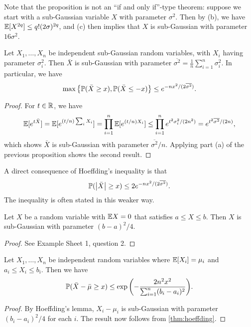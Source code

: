 Note that the proposition is not an ``if and only if''-type theorem: suppose we start with a sub-Gaussian variable $X$ with parameter $\sigma^2$. Then by (b), we have $\mathbb E[X^{2q}] \leq q!(2\sigma)^{2q}$, and (c) then implies that $X$ is sub-Gaussian with parameter $16\sigma^2$. 

\begin{theorem} \label{thm:hoeffding}
	Let $X_1, \dotsc, X_n$ be independent sub-Gaussian random variables, with $X_i$ having parameter $\sigma_i^2$. Then $\bar X$ is sub-Gaussian with parameter $\overline{\sigma^2} = \frac1n \sum_{i=1}^n \sigma_i^2$. In particular, we have
	\[
	\max\qty{\mathbb P(\bar X \geq x), \mathbb P(\bar X \leq -x)} \leq e^{-nx^2/(2\overline{\sigma^2})}.
	\]
\end{theorem}

\begin{proof}
	For $t \in \mathbb R$, we have
	\[
	\mathbb E[e^{t\bar X}] = \mathbb E[e^{(t/n)\sum_i X_i}] = \prod_{i=1}^n \mathbb E[e^{(t/n)X_i}] \leq \prod_{i=1}^n e^{t^2\sigma_i^2/(2n^2)} = e^{t^2\overline{\sigma^2}/(2n)},
	\]
	which shows $\bar X$ is sub-Gaussian with parameter $\overline{\sigma^2}/n$. Applying part (a) of the previous proposition shows the second result. 
\end{proof}

\begin{remark}
	A direct consequence of Hoeffding's inequality is that
	\[
	\mathbb P(\abs{\bar X} \geq x) \leq 2 e^{-nx^2/(2\overline{\sigma^2})}.
	\]
	The inequality is often stated in this weaker way. 
\end{remark}

\begin{lemma}
	Let $X$ be a random variable with $\mathbb E X = 0$ that satisfies $a \leq X \leq b$. Then $X$ is sub-Gaussian with parameter $(b-a)^2/4$. 
\end{lemma}

\begin{proof}
	See Example Sheet 1, question 2. 
\end{proof}

\begin{corollary}
	Let $X_1, \dotsc, X_n$ be independent random variables where $\mathbb E[X_i] = \mu_i$ and $a_i \leq X_i \leq b_i$. Then we have
	\[
	\mathbb P(\bar X - \bar \mu \geq x) \leq \exp\qty(-\frac{2n^2x^2}{\sum_{i=1}^n (b_i - a_i)^2}). 
	\]
\end{corollary}

\begin{proof}
	By Hoeffding's lemma, $X_i - \mu_i$ is sub-Gaussian with parameter $(b_i - a_i)^2/4$ for each $i$. The result now follows from \cref{thm:hoeffding}.
\end{proof}

